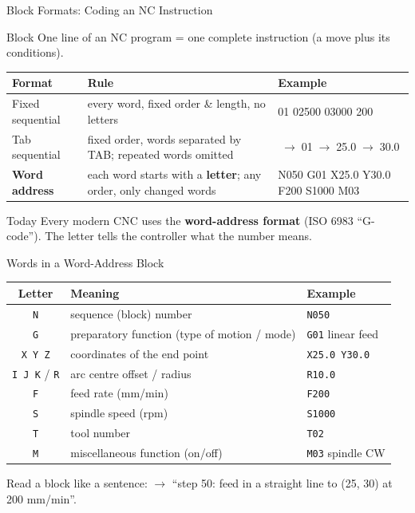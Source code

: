 \documentclass[aspectratio=169]{beamer}
\begin{document}
	\begin{frame}{Block Formats: Coding an NC Instruction}
		\begin{block}{Block}
			One line of an NC program = one complete instruction (a move plus its conditions).
		\end{block}
		\renewcommand{\arraystretch}{1.15}
		\centering
		\footnotesize
		\begin{tabular}{@{}>{\raggedright}p{2.8cm}>{\raggedright}p{4.6cm}>{\ttfamily\raggedright\arraybackslash}p{5.6cm}@{}}
			\toprule
			\textbf{Format} & \textbf{Rule} & \textrm{\textbf{Example}} \\
			\midrule
			Fixed sequential  & every word, fixed order \& length, no letters & 0050 01 02500 03000 200 \\
			Tab sequential    & fixed order, words separated by TAB; repeated words omitted & 050$\;\to\;$01$\;\to\;$25.0$\;\to\;$30.0 \\
			\textbf{Word address} & each word starts with a \textbf{letter}; any order, only changed words & N050 G01 X25.0 Y30.0 F200 S1000 M03 \\
			\bottomrule
		\end{tabular}
		\vspace{0.15cm}
		\begin{block}{Today}
			\small Every modern CNC uses the \textbf{word-address format} (ISO 6983 ``G-code''). The letter tells the controller what the number means.
		\end{block}
	\end{frame}

	\begin{frame}{Words in a Word-Address Block}
		\renewcommand{\arraystretch}{1.25}
		\centering
		\begin{tabular}{@{}cll@{}}
			\toprule
			\textbf{Letter} & \textbf{Meaning} & \textbf{Example} \\
			\midrule
			\texttt{N} & sequence (block) number             & \texttt{N050} \\
			\texttt{G} & preparatory function (type of motion / mode) & \texttt{G01} linear feed \\
			\texttt{X Y Z} & coordinates of the end point      & \texttt{X25.0 Y30.0} \\
			\texttt{I J K} / \texttt{R} & arc centre offset / radius & \texttt{R10.0} \\
			\texttt{F} & feed rate (mm/min)                   & \texttt{F200} \\
			\texttt{S} & spindle speed (rpm)                  & \texttt{S1000} \\
			\texttt{T} & tool number                          & \texttt{T02} \\
			\texttt{M} & miscellaneous function (on/off)      & \texttt{M03} spindle CW \\
			\bottomrule
		\end{tabular}
		\vspace{0.3cm}

		\centering\small Read a block like a sentence:\;
		 $\rightarrow$ ``step 50: feed in a straight line to (25, 30) at 200 mm/min''.
	\end{frame}
\end{document}
